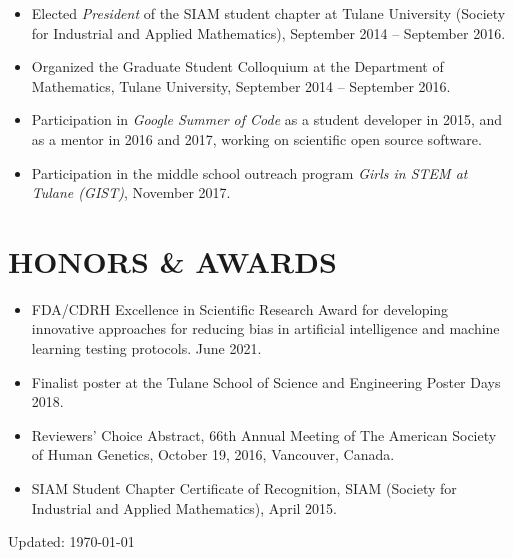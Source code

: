 \documentclass[overlapped, line, 10pt]{res} %
\begin{document}
\begin{resume}
\begin{itemize}
  \item Elected {\it President} of the SIAM student chapter at Tulane University (Society for Industrial and Applied Mathematics), September 2014 -- September 2016.
  \item Organized the Graduate Student Colloquium at the Department of Mathematics, Tulane University, September 2014 -- September 2016.
  \item Participation in \emph{Google Summer of Code} as a student developer in 2015, and as a mentor in 2016 and 2017, working on scientific open source software.
  \item Participation in the middle school outreach program \emph{Girls in STEM at Tulane (GIST)}, November 2017.
\end{itemize}


\section{HONORS \& AWARDS}

\begin{itemize}
  \item FDA/CDRH Excellence in Scientific Research Award for developing innovative approaches for reducing bias in artificial intelligence and machine learning testing protocols. June 2021.
  \item Finalist poster at the Tulane School of Science and Engineering Poster Days 2018.
  \item Reviewers’ Choice Abstract, 66th Annual Meeting of The American Society of Human Genetics, October 19, 2016, Vancouver, Canada.
  \item SIAM Student Chapter Certificate of Recognition, SIAM (Society for Industrial and Applied Mathematics), April 2015.
\end{itemize}

\vfill
\centerline{Updated: \today}


\end{resume}
\end{document}
